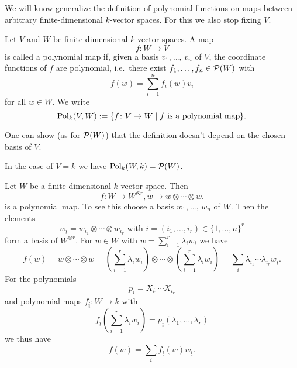 We will know generalize the definition of polynomial functions on maps between arbitrary finite-dimensional $k$-vector spaces. For this we also stop fixing $V$.


\begin{defi}
 Let $V$ and $W$ be finite dimensional $k$-vector spaces. A map
 \[
  f \colon W \to V
 \]
 is called a polynomial map if, given a basis $v_1$, \dots, $v_n$ of $V$, the coordinate functions of $f$ are polynomial, i.e.\ there exist $f_1, \dotsc, f_n \in \mathcal{P}(W)$ with
 \[
  f(w) = \sum_{i=1}^n f_i(w) v_i
 \]
 for all $w \in W$. We write
 \[
  \operatorname{Pol}_k(V,W) := \{f \colon V \to W \mid f \text{ is a polynomial map}\}.
 \]
\end{defi}


\begin{rem}
 One can show (as for $\mathcal{P}(W)$) that the definition doesn’t depend on the chosen basis of $V$.
\end{rem}


\begin{rem}
 In the case of $V = k$ we have $\operatorname{Pol}_k(W,k) = \mathcal{P}(W)$.
\end{rem}


\begin{expl}
 Let $W$ be a finite dimensional $k$-vector space. Then
 \[
  f \colon W \to W^{\otimes r}, w \mapsto w \otimes \dotsb \otimes w.
 \]
 is a polynomial map. To see this choose a basis $w_1$, \dots, $w_n$ of $W$. Then the elements
 \[
  w_{\underline{i}} = w_{i_1} \otimes \dotsb \otimes w_{i_r} \text{ with } \underline{i} = (i_1, \dotsc, i_r) \in \{1, \dotsc, n\}^r
 \]
 form a basis of $W^{\otimes r}$. For $w \in W$ with $w = \sum_{i=1}^r \lambda_i w_i$ we have
 \[
  f(w)
  = w \otimes \dotsb \otimes w
  = \left( \sum_{i=1}^r \lambda_i w_i \right) \otimes \dotsb \otimes \left( \sum_{i=1}^r \lambda_i w_i \right)
  = \sum_{\underline{i}} \lambda_{i_1} \dotsm \lambda_{i_r} w_{\underline{i}}.
 \]
 For the polynomials
 \[
  p_{\underline{i}} = X_{i_1} \dotsm X_{i_r}
 \]
 and polynomial maps $f_{\underline{i}} \colon W \to k$ with
 \[
  f_{\underline{i}}\left(\sum_{i=1}^r \lambda_i w_i\right) = p_{\underline{i}}(\lambda_1, \dotsc, \lambda_r)
 \]
 we thus have
 \[
  f(w) = \sum_{\underline{i}} f_{\underline{i}}(w) w_{\underline{i}}.
 \]
\end{expl}


